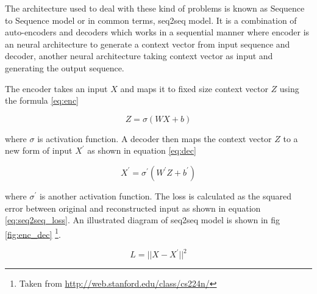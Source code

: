 The architecture used to deal with these kind of problems is known as Sequence to Sequence model or in common terms, seq2seq model. It is a combination of auto-encoders and decoders which works in a sequential manner where encoder is an neural architecture to generate a context vector from input sequence and decoder, another neural architecture taking context vector as input and generating the output sequence.

The encoder takes an input $X$ and maps it to fixed size context vector $Z$ using the formula \cref{eq:enc}

\begin{equation}
    \label{eq:enc}
        Z = \sigma(WX + b)
\end{equation}

where $\sigma$ is activation function. A decoder then maps the context vector $Z$ to a new form of input $X^{\prime}$ as shown in equation \cref{eq:dec}

\begin{equation}
    \label{eq:dec}
        X^{\prime} = \sigma^{\prime}(W^{\prime}Z + b^{\prime})
\end{equation}

where $\sigma^{\prime}$ is another activation function. The loss is calculated as the squared error between original and reconstructed input as shown in equation \cref{eq:seq2seq_loss}. An illustrated diagram of seq2seq model is shown in fig \cref{fig:enc_dec} \footnote{Taken from \url{http://web.stanford.edu/class/cs224n/}}.

\begin{equation}
    \label{eq:seq2seq_loss}
        L = ||X-X^{\prime}||^{2}
\end{equation}

